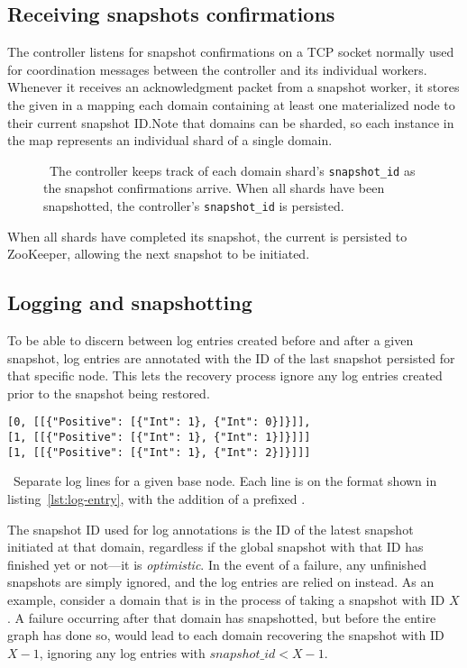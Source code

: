 \subsection{Receiving snapshots confirmations}

The controller listens for snapshot confirmations on a TCP socket normally used
for coordination messages between the controller and its individual workers.
Whenever it receives an acknowledgment packet from a snapshot worker, it stores
the given  in a  mapping each domain containing
at least one materialized node to their current snapshot ID.\@ Note that domains
can be sharded, so each instance in the map represents an individual shard of a
single domain.

\begin{figure}[H]
  
  \caption{\
    The controller keeps track of each domain shard's \texttt{snapshot\_id} as
    the snapshot confirmations arrive. When all shards have been snapshotted,
    the controller's \texttt{snapshot\_id} is persisted.
  }\label{fig:snapshot-id}
\end{figure}

When all shards have completed its snapshot, the current  is
persisted to ZooKeeper, allowing the next snapshot to be initiated.

\subsection{Logging and snapshotting}

To be able to discern between log entries created before and after a given
snapshot, log entries are annotated with the ID of the last snapshot persisted
for that specific node. This lets the recovery process ignore any log entries
created prior to the snapshot being restored.

\begin{listing}[H]
  \begin{verbatim}
[0, [[{"Positive": [{"Int": 1}, {"Int": 0}]}]],
[1, [[{"Positive": [{"Int": 1}, {"Int": 1}]}]]]
[1, [[{"Positive": [{"Int": 1}, {"Int": 2}]}]]]
  \end{verbatim}
  \caption{\
    Separate log lines for a given base node. Each line is on the format shown
    in listing~\ref{lst:log-entry}, with the addition of a prefixed
    \code{snapshot\_id}.
  }
\end{listing}

The snapshot ID used for log annotations is the ID of the latest snapshot
initiated at that domain, regardless if the global snapshot with that ID has
finished yet or not---it is \textit{optimistic}. In the event of a failure, any
unfinished snapshots are simply ignored, and the log entries are relied on
instead. As an example, consider a domain that is in the process of taking a
snapshot with ID $ X $. A failure occurring after that domain has snapshotted,
but before the entire graph has done so, would lead to each domain recovering
the snapshot with ID $ X - 1 $, ignoring any log entries with $ snapshot\_id < X
- 1 $.

